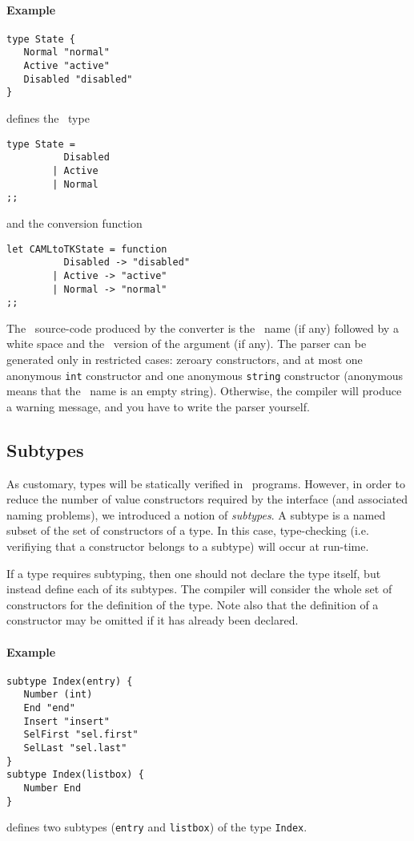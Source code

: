 \paragraph{Example}
\begin{verbatim}
type State { 
   Normal "normal"
   Active "active"
   Disabled "disabled"
}
\end{verbatim} 
defines the \caml\ type
\begin{verbatim}
type State =
          Disabled
        | Active
        | Normal
;;
\end{verbatim} 
and the conversion function
\begin{verbatim}
let CAMLtoTKState = function
          Disabled -> "disabled"
        | Active -> "active"
        | Normal -> "normal"
;;
\end{verbatim} 

The \tcl\ source-code produced by the converter is the \tk\ name (if any)
followed by a white space and the \tk\ version of the argument (if any).
The parser can be generated only in restricted cases: zeroary constructors,
and at most one anonymous \verb|int| constructor and one anonymous
\verb|string| constructor (anonymous means that the \tk\ name is an empty
string). Otherwise, the compiler will produce a warning
message, and you have to write the parser yourself. 

\subsection{Subtypes}
As customary, types will be statically verified in \caml\ programs. However, in
order to reduce the number of value constructors required by the interface
(and associated naming problems),
we introduced a notion of {\em subtypes}. A subtype is a named subset of the
set of constructors of a type. In this case, type-checking (i.e. verifiying
that a constructor belongs to a subtype) will occur at run-time.

If a type requires subtyping, then one should not declare the type itself,
but instead define each of its subtypes. The compiler will consider the
whole set of constructors for the definition of the type. Note also that the
definition of a constructor may be omitted if it has  already been declared.

\paragraph{Example}
\begin{verbatim}
subtype Index(entry) {
   Number (int)
   End "end"
   Insert "insert"
   SelFirst "sel.first"
   SelLast "sel.last" 
}
subtype Index(listbox) {
   Number End 
}
\end{verbatim}
defines two subtypes (\verb|entry| and \verb|listbox|) of the type
\verb|Index|.  

